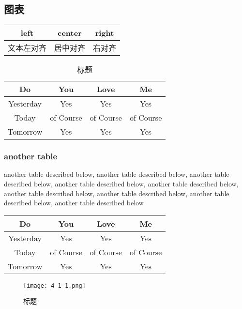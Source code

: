 \documentclass[twocolumn]{ctexart}
\begin{document}
            \subsection{图表}
                \begin{tabular}{ccc}
                    \hline
                    left & center & right \\
                    \hline
                    文本左对齐 & 居中对齐 & 右对齐 \\
                    \hline
                \end{tabular}
                \begin{table}[h]
                    \centering
                    \caption{标题}
                    \label{表格}
                    \begin{tabular}{cccc}
                        \hline
                        \bfseries Do & \bfseries You  & \bfseries Love & \bfseries Me \\
                        \hline
                        Yesterday & Yes & Yes & Yes \\
                        Today & of Course & of Course & of Course \\
                        Tomorrow & Yes & Yes & Yes \\
                        \hline
                    \end{tabular}
                \end{table}
                \subsubsection{another table}
                another table described below, another table described below, another table described below,
                another table described below, another table described below, another table described below,
                another table described below, another table described below, another table described below

                \begin{table}[h] %
                    \centering
                    \begin{tabular}{cccc}
                        \toprule
                        \bfseries Do & \bfseries You  & \bfseries Love & \bfseries Me \\
                        \midrule
                        Yesterday & Yes & Yes & Yes \\
                        Today & of Course & of Course & of Course \\
                        Tomorrow & Yes & Yes & Yes \\
                        \bottomrule
                    \end{tabular}
                \end{table}
                \begin{figure}
                    \centering
                    \caption{标题}
                    \texttt{[image: 4-1-1.png]}
                \end{figure}

                
                \nocite{*}
\end{document}
